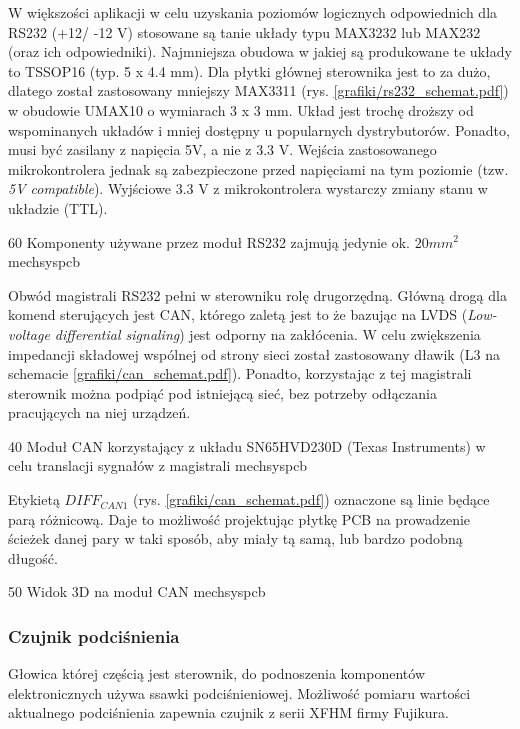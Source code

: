 W większości aplikacji w celu uzyskania poziomów logicznych odpowiednich dla RS232 (+12/ -12 V) stosowane są tanie układy typu MAX3232 lub MAX232 (oraz ich odpowiedniki). Najmniejsza obudowa w jakiej są produkowane te układy to TSSOP16 (typ. 5 x 4.4 mm). Dla płytki głównej sterownika jest to za dużo, dlatego został zastosowany mniejszy   MAX3311 (rys. \ref{grafiki/rs232_schemat.pdf}) w obudowie UMAX10 o wymiarach 3 x 3 mm. Układ jest trochę droższy od wspominanych układów i mniej dostępny u popularnych dystrybutorów. Ponadto, musi być zasilany z napięcia 5V, a nie z 3.3 V. Wejścia zastosowanego mikrokontrolera jednak są zabezpieczone przed napięciami na tym poziomie (tzw. {\it 5V compatible}). Wyjściowe 3.3 V z mikrokontrolera wystarczy zmiany stanu w układzie (TTL).

	{60}
	{Komponenty używane przez moduł RS232 zajmują jedynie ok. $ 20 mm^2 $}
	{mechsyspcb}

Obwód magistrali RS232 pełni w sterowniku rolę drugorzędną. Główną drogą dla komend sterujących jest CAN, którego zaletą jest to że bazując na LVDS ({\it Low-voltage differential signaling}) jest odporny na zakłócenia. W celu zwiększenia impedancji składowej wspólnej od strony sieci został zastosowany dławik (L3 na schemacie \ref{grafiki/can_schemat.pdf}). Ponadto, korzystając z tej magistrali sterownik można podpiąć pod istniejącą sieć, bez potrzeby odłączania pracujących na niej urządzeń.

	{40}
	{Moduł CAN korzystający z układu SN65HVD230D (Texas Instruments) w celu translacji sygnałów z magistrali}
	{mechsyspcb}
	
Etykietą $ DIFF_{CAN1} $ (rys. \ref{grafiki/can_schemat.pdf}) oznaczone są linie będące parą różnicową. Daje to możliwość projektując płytkę PCB na prowadzenie ścieżek danej pary w taki sposób, aby miały tą samą, lub bardzo podobną długość.

	{50}
	{Widok 3D na moduł CAN}
	{mechsyspcb}
	
\subsubsection{Czujnik podciśnienia}
\label{sss:pressure_sensor}

Głowica której częścią jest sterownik, do podnoszenia komponentów elektronicznych używa ssawki podciśnieniowej. Możliwość pomiaru wartości aktualnego podciśnienia zapewnia czujnik z serii XFHM firmy Fujikura. 

